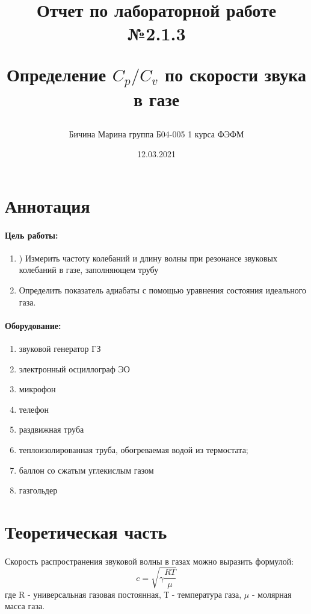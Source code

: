 \documentclass[a4paper,12pt]{article}
\author{Бичина Марина 
группа Б04-005 1 курса ФЭФМ}
\title{Отчет по лабораторной работе №2.1.3


Определение $C_p/C_v$ по скорости звука в газе}
\date{12.03.2021}
\begin{document}

\maketitle
\newpage

\section{Аннотация}

\paragraph{Цель работы:} 
\begin{enumerate}
\itemsep0em
\item ) Измерить частоту колебаний и длину волны при резонансе звуковых колебаний в газе, заполняющем трубу 
\item Определить показатель адиабаты с помощью уравнения состояния идеального газа.
\end{enumerate}
\paragraph{Оборудование:}
\begin{enumerate}
\itemsep0em
\item звуковой генератор ГЗ
\item электронный
осциллограф ЭО
\item микрофон
\item телефон
\item раздвижная труба
\item теплоизолированная труба, обогреваемая водой из термостата;
\item баллон со сжатым углекислым газом
\item газгольдер
\end{enumerate}
\section{Теоретическая часть}
\paragraph{} 
Скорость распространения звуковой волны в газах можно выразить формулой:
\begin{equation}
c = \sqrt{\gamma\frac{RT}{\mu}}
\end{equation}
где R - универсальная газовая постоянная, Т - температура газа, $\mu$ - молярная масса газа.
\end{document}
